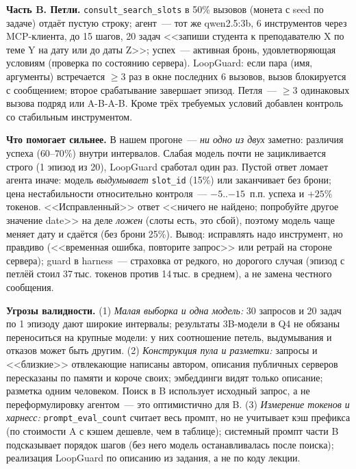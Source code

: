 \documentclass[10pt,a4paper]{article}
\newcommand{\code}[1]{\texttt{#1}}
\begin{document}
\vspace{4pt}
\textbf{Часть B. Петли.} \code{consult\_search\_slots} в 50\% вызовов (монета с seed по задаче) отдаёт пустую строку; агент~--- тот же qwen2.5:3b, 6 инструментов через MCP-клиента, до 15 шагов, 20 задач <<запиши студента к преподавателю X по теме Y на дату или до даты Z>>; успех~--- активная бронь, удовлетворяющая условиям (проверка по состоянию сервера). LoopGuard: если пара (имя, аргументы) встречается $\ge3$ раз в окне последних 6 вызовов, вызов блокируется с сообщением; второе срабатывание завершает эпизод. Петля~--- $\ge3$ одинаковых вызова подряд или A-B-A-B. Кроме трёх требуемых условий добавлен контроль со стабильным инструментом.

\begin{center}\small
{}
\resizebox{\textwidth}{!}{}
\end{center}

\textbf{Что помогает сильнее.} В нашем прогоне~--- \emph{ни одно из двух} заметно: различия успеха ($60$--$70\%$) внутри интервалов. Слабая модель почти не зацикливается строго (1 эпизод из 20), LoopGuard сработал один раз. Пустой ответ ломает агента иначе: модель \emph{выдумывает} \code{slot\_id} (15\%) или заканчивает без брони; цена нестабильности относительно контроля~--- $-5$..$-15$~п.п. успеха и $+25\%$ токенов. <<Исправленный>> ответ <<ничего не найдено; попробуйте другое значение date>> на деле \emph{ложен} (слоты есть, это сбой), поэтому модель чаще меняет дату и сдаётся (без брони 25\%). Вывод: исправлять надо инструмент, но правдиво (<<временная ошибка, повторите запрос>> или ретрай на стороне сервера); guard в harness~--- страховка от редкого, но дорогого случая (эпизод с петлёй стоил 37\,тыс. токенов против 14\,тыс. в среднем), а не замена честного сообщения.

\textbf{Угрозы валидности.}
(1) \emph{Малая выборка и одна модель:} 30 запросов и 20 задач по 1 эпизоду дают широкие интервалы; результаты 3B-модели в Q4 не обязаны переноситься на крупные модели: у них соотношение петель, выдумывания и отказов может быть другим.
(2) \emph{Конструкция пула и разметки:} запросы и <<близкие>> отвлекающие написаны автором, описания публичных серверов пересказаны по памяти и короче своих; эмбеддинги видят только описание; разметка одним человеком. Поиск в B использует исходный запрос, а не переформулировку агентом~--- это оптимистично для B.
(3) \emph{Измерение токенов и харнесс:} \code{prompt\_eval\_count} считает весь промпт, но не учитывает кэш префикса (по стоимости A с кэшем дешевле, чем в таблице); системный промпт части B подсказывает порядок шагов (без него модель останавливалась после поиска); реализация LoopGuard по описанию из задания, а не по коду лекции.
\end{document}
